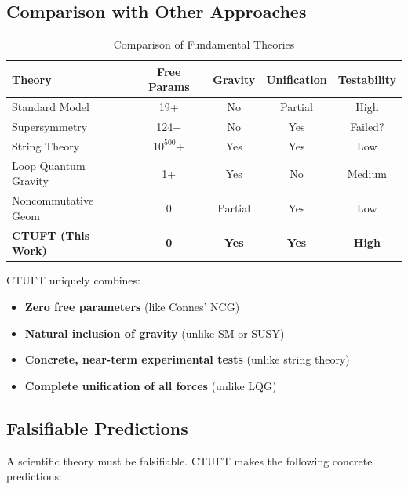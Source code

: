 \subsection{Comparison with Other Approaches}

\begin{table}[htbp]
\centering
\caption{Comparison of Fundamental Theories}
\begin{tabular}{@{}lcccc@{}}
\hline
\textbf{Theory} & \textbf{Free Params} & \textbf{Gravity} & \textbf{Unification} & \textbf{Testability} \\
\hline
Standard Model & 19+ & No & Partial & High \\
Supersymmetry & 124+ & No & Yes & Failed? \\
String Theory & $10^{500}$+ & Yes & Yes & Low \\
Loop Quantum Gravity & 1+ & Yes & No & Medium \\
Noncommutative Geom & 0 & Partial & Yes & Low \\
\textbf{CTUFT (This Work)} & \textbf{0} & \textbf{Yes} & \textbf{Yes} & \textbf{High} \\
\hline
\end{tabular}
\end{table}

CTUFT uniquely combines:
\begin{itemize}
    \item \textbf{Zero free parameters} (like Connes' NCG)
    \item \textbf{Natural inclusion of gravity} (unlike SM or SUSY)
    \item \textbf{Concrete, near-term experimental tests} (unlike string theory)
    \item \textbf{Complete unification of all forces} (unlike LQG)
\end{itemize}

\subsection{Falsifiable Predictions}

A scientific theory must be falsifiable. CTUFT makes the following concrete predictions:


